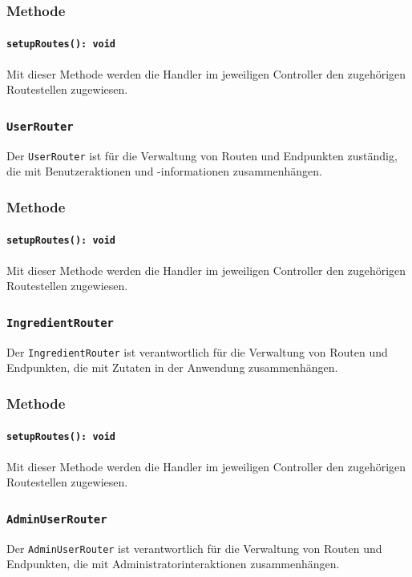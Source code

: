 \documentclass{entwurfsheft}
\begin{document}
\subsubsection*{Methode}
\paragraph{\texttt{setupRoutes(): void}}
Mit dieser Methode werden die Handler im jeweiligen Controller den zugehörigen Routestellen zugewiesen.

\subsubsection{\texttt{UserRouter}}\label{sec:UserRouter}
Der \texttt{UserRouter} ist für die Verwaltung von Routen und Endpunkten zuständig, die mit Benutzeraktionen und -informationen zusammenhängen.
\subsubsection*{Methode}
\paragraph{\texttt{setupRoutes(): void}}
Mit dieser Methode werden die Handler im jeweiligen Controller den zugehörigen Routestellen zugewiesen.

\subsubsection{\texttt{IngredientRouter}}\label{sec:IngredientRouter}
Der \texttt{IngredientRouter} ist verantwortlich für die Verwaltung von Routen und Endpunkten, die mit Zutaten in der Anwendung zusammenhängen.
\subsubsection*{Methode}
\paragraph{\texttt{setupRoutes(): void}}
Mit dieser Methode werden die Handler im jeweiligen Controller den zugehörigen Routestellen zugewiesen.

\subsubsection{\texttt{AdminUserRouter}}\label{sec:AdminUserRouter}
Der \texttt{AdminUserRouter} ist verantwortlich für die Verwaltung von Routen und Endpunkten, die mit Administratorinteraktionen zusammenhängen.
\end{document}

